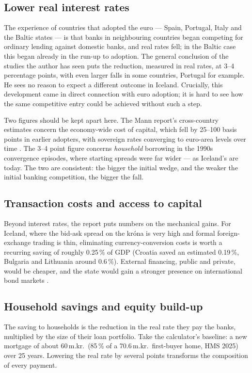 \documentclass[11pt,a4paper]{article}
\begin{document}
\subsection{Lower real interest rates}
The experience of countries that adopted the euro --- Spain, Portugal, Italy and
the Baltic states --- is that banks in neighbouring countries began competing
for ordinary lending against domestic banks, and real rates fell; in the
Baltic case this began already in the run-up to adoption. The general
conclusion of the studies the author has seen puts the reduction, measured in
real rates, at 3--4 percentage points, with even larger falls in some
countries, Portugal for example. He sees no reason to expect a different
outcome in Iceland. Crucially, this development came in direct connection with
euro adoption; it is hard to see how the same competitive entry could be
achieved without such a step.

Two figures should be kept apart here. The Mann report's cross-country
estimates concern the economy-wide cost of capital, which fell by 25--100
basis points in earlier adopters, with sovereign rates converging to euro-area
levels over time \citep{mann2026}. The 3--4 point figure concerns
\emph{household} borrowing in the 1990s convergence episodes, where starting
spreads were far wider --- as Iceland's are today. The two are consistent:
the bigger the initial wedge, and the weaker the initial banking competition,
the bigger the fall.

\subsection{Transaction costs and access to capital}
Beyond interest rates, the report puts numbers on the mechanical gains. For
Iceland, where the bid-ask spread on the kr\'ona is very high and formal
foreign-exchange trading is thin, eliminating currency-conversion costs is
worth a recurring saving of roughly 0.25\,\% of GDP (Croatia saved an
estimated 0.19\,\%, Bulgaria and Lithuania around 0.6\,\%). External
financing, public and private, would be cheaper, and the state would gain a
stronger presence on international bond markets \citep{mann2026}.

\subsection{Household savings and equity build-up}
The saving to households is the reduction in the real rate they pay the banks,
multiplied by the size of their loan portfolio. Take the calculator's baseline:
a new mortgage of about 60\,m.kr.\ (85\,\% of a 70.6\,m.kr.\ first-buyer home,
HMS 2025) over 25 years. Lowering the real rate by several points transforms the
composition of every payment.
\end{document}
